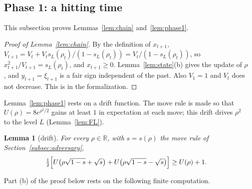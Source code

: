 \documentclass[12pt]{amsart}
\newtheorem{lemma}[theorem]{Lemma}
\theoremstyle{definition}
\numberwithin{equation}{section}
\newcommand{\R}{\mathbb{R}}
\newcommand{\leanmap}[1]{\ignorespaces}
\begin{document}
\subsection{Phase 1: a hitting time}\label{subsec:phase1}
This subsection proves Lemmas~\ref{lem:chain} and~\ref{lem:phase1}.

\begin{proof}[Proof of Lemma~\ref{lem:chain}]
By the definition of $x_{t+1}$, $V_{t+1}=V_t+V_ts_L(\rho_t)/(1-s_L(\rho_t))=V_t/(1-s_L(\rho_t))$, so $x_{t+1}^2/V_{t+1}=s_L(\rho_t)$, and $x_{t+1}\ge0$. Lemma~\ref{lem:state}(b) gives the update of $\rho$, and $y_{t+1}=\xi_{t+1}$ is a fair sign independent of the past. Also $V_1=1$ and $V_t$ does not decrease. This is  in the formalization.
\end{proof}

Lemma~\ref{lem:phase1} rests on a drift function. The move rule is made so that $U(\rho)=8e^{\rho^2/2}$ gains at least $1$ in expectation at each move; this drift drives $\rho^2$ to the level $L$ (Lemma~\ref{lem:FL}).

\begin{lemma}[drift]\label{lem:drift}
\leanmap{RegretKappa.LowerSharp.drift, RegretKappa.LowerSharp.driftGap_large, RegretKappa.LowerSharp.chi_le,
  RegretKappa.LowerSharp.drift_table}
For every $\rho\in\R$, with $s=s(\rho)$ the move rule of Section~\ref{subsec:adversary},
\[
\tfrac12\Bigl[U\bigl(\rho\sqrt{1-s}+\sqrt s\bigr)+U\bigl(\rho\sqrt{1-s}-\sqrt s\bigr)\Bigr]\ge U(\rho)+1 .
\]
\end{lemma}

Part (b) of the proof below rests on the following finite computation.
\end{document}
